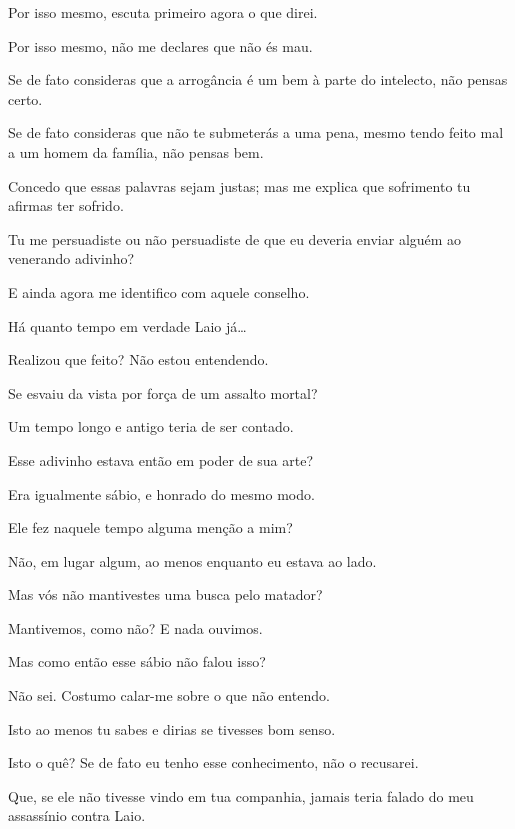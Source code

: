    Por isso mesmo, escuta primeiro agora o que direi.

   Por isso mesmo, não me declares que não és mau.

   Se de fato consideras que a arrogância é um bem à parte do intelecto,
não pensas certo.

   Se de fato consideras que não te submeterás a uma pena, mesmo tendo
feito mal a um homem da família, não pensas bem.

   Concedo que essas palavras sejam justas; mas me explica que sofrimento
tu afirmas ter sofrido.

   Tu me persuadiste ou não persuadiste de que eu deveria enviar alguém ao
venerando adivinho?

   E ainda agora me identifico com aquele conselho.

  Há quanto tempo em verdade Laio já\ldots{}  

   Realizou que feito? Não estou entendendo.

    Se esvaiu da vista por força de um assalto mortal?

   Um tempo longo e antigo teria de ser contado.

   Esse adivinho estava então em poder de sua arte?

   Era igualmente sábio, e honrado do mesmo modo.

   Ele fez naquele tempo alguma menção a mim?

   Não, em lugar algum, ao menos enquanto eu estava ao lado.

   Mas vós não mantivestes uma busca pelo matador?

   Mantivemos, como não? E nada ouvimos.

   Mas como então esse sábio não falou isso?

   Não sei. Costumo calar-me sobre o que não entendo.

   Isto ao menos tu sabes  e dirias se tivesses bom senso.

   Isto o quê? Se de fato eu tenho esse conhecimento, não o recusarei.

   Que, se ele não tivesse vindo em tua companhia, jamais teria falado do
meu assassínio contra Laio.

